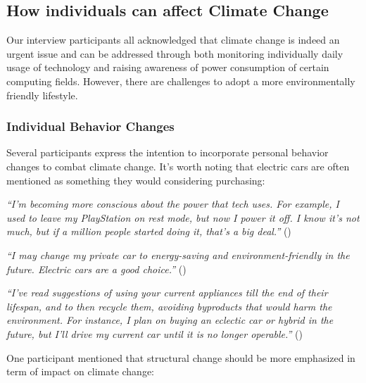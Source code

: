     \subsection{How individuals can affect Climate Change}
    
    Our interview participants all acknowledged that climate change is indeed an urgent issue and can be addressed through both monitoring individually daily usage of technology and raising awareness of power consumption of certain computing fields. However, there are challenges to adopt a more environmentally friendly lifestyle.
    
    \subsubsection{Individual Behavior Changes}
    
    Several participants express the intention to incorporate personal behavior changes to combat climate change. It's worth noting that electric cars are often mentioned as something they would considering purchasing:
    
    \begin{quoting}
        \textit{``I'm becoming more conscious about the power that tech uses. For example, I used to leave my PlayStation on rest mode, but now I power it off. I know it's not much, but if a million people started doing it, that's a big deal.''} () %
    \end{quoting}
    
    \begin{quoting}
        \textit{``I may change my private car to energy-saving and environment-friendly in the future. Electric cars are a good choice.''} ()
    \end{quoting}
    

    \begin{quoting}
        \textit{``I've read suggestions of using your current appliances till the end of their lifespan, and to then recycle them, avoiding byproducts that would harm the environment. For instance, I plan on buying an eclectic car or hybrid in the future, but I'll drive my current car until it is no longer operable.''} ()
    \end{quoting}
    
    One participant mentioned that structural change should be more emphasized in term of impact on climate change:
    
